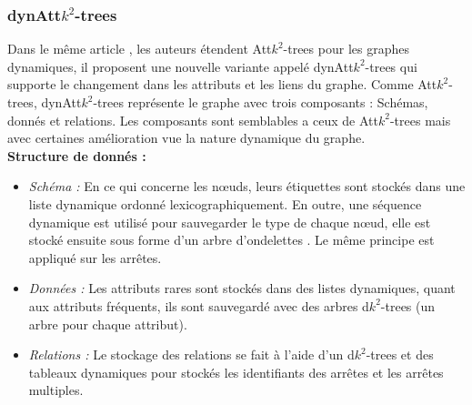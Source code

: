 \subsubsection{dynAtt$k^2$-trees }
Dans le même article \citep{alvarez2018compact}, les auteurs étendent Att$k^2$-trees pour les graphes dynamiques, il proposent une nouvelle variante appelé dynAtt$k^2$-trees qui supporte le changement dans les attributs et les liens du graphe. Comme Att$k^2$-trees, dynAtt$k^2$-trees représente le graphe avec trois composants : Schémas, donnés et relations. Les composants sont semblables a ceux de Att$k^2$-trees mais avec certaines amélioration vue la nature dynamique du graphe.\\
\textbf{Structure de donnés : } 
\begin{itemize}
\item \textit{Schéma :}  En ce qui concerne les nœuds, leurs étiquettes sont stockés dans une liste dynamique ordonné lexicographiquement. En outre, une séquence dynamique est utilisé pour sauvegarder le type de chaque nœud, elle est stocké ensuite sous forme d'un arbre d'ondelettes \citep{grossi2003high}. Le même principe est appliqué sur les arrêtes. 
\item \textit{Données :} Les attributs rares sont stockés dans des listes dynamiques, quant aux attributs fréquents, ils sont sauvegardé avec des arbres d$k^2$-trees (un arbre pour chaque attribut).
\item \textit{Relations :} Le stockage des relations se fait à l'aide d'un d$k^2$-trees et des tableaux dynamiques pour stockés les identifiants des arrêtes et les arrêtes multiples.
\end{itemize}




























